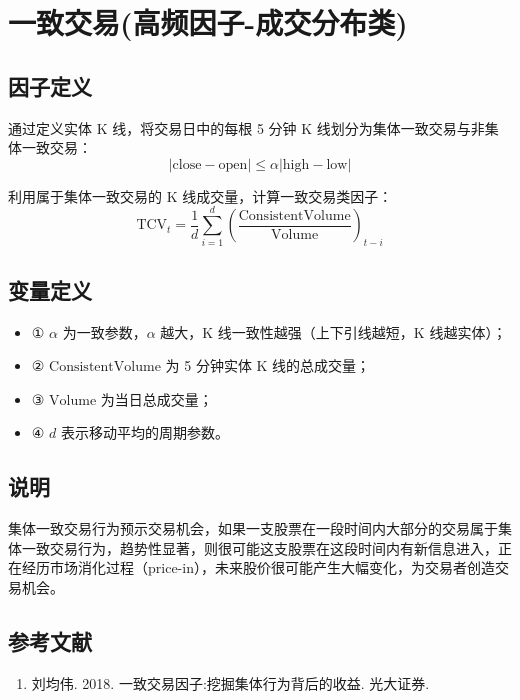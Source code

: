 \documentclass{article}
\begin{document}
\section{一致交易(高频因子-成交分布类)}

\subsection{因子定义}

通过定义实体 K 线，将交易日中的每根 5 分钟 K 线划分为集体一致交易与非集体一致交易：
\begin{equation}
    |\mathrm{close} - \mathrm{open}| \leq \alpha |\mathrm{high} - \mathrm{low}|
\end{equation}

利用属于集体一致交易的 K 线成交量，计算一致交易类因子：
\begin{equation}
    \mathrm{TCV}_t = \frac{1}{d} \sum_{i=1}^{d} \left( \frac{\mathrm{ConsistentVolume}}{\mathrm{Volume}} \right)_{t-i}
\end{equation}

\subsection{变量定义}
\begin{itemize}
    \item ① \( \alpha \) 为一致参数，\( \alpha \) 越大，K 线一致性越强（上下引线越短，K 线越实体）；
    \item ② \( \mathrm{ConsistentVolume} \) 为 5 分钟实体 K 线的总成交量；
    \item ③ \( \mathrm{Volume} \) 为当日总成交量；
    \item ④ \( d \) 表示移动平均的周期参数。
\end{itemize}

\subsection{说明}
集体一致交易行为预示交易机会，如果一支股票在一段时间内大部分的交易属于集体一致交易行为，趋势性显著，则很可能这支股票在这段时间内有新信息进入，正在经历市场消化过程（price-in），未来股价很可能产生大幅变化，为交易者创造交易机会。

\subsection{参考文献}
\begin{enumerate}
    \item 刘均伟. 2018. 一致交易因子:挖掘集体行为背后的收益. 光大证券.
\end{enumerate}
\end{document}
